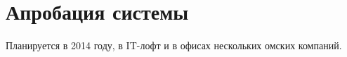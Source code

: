 \chapter{Апробация системы} \label{chapt4}

Планируется в 2014 году, в IT-лофт и в офисах нескольких омских компаний.